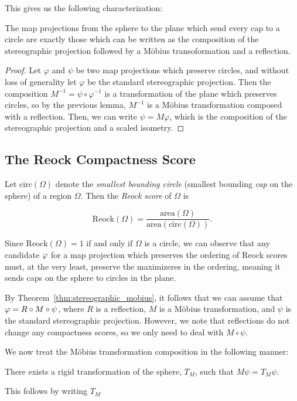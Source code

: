 This gives us the following characterization:
\begin{theorem}\label{thm:stereographic_mobius}
  The map projections from the sphere to the plane which send every
  cap to a circle are exactly those which can be written as the
  composition of the stereographic projection followed by a 
  M\"{o}bius transoformation and a reflection.
\end{theorem}
\begin{proof}
  Let $\varphi$ and $\psi$ be two map projections which preserve
  circles, and without loss of generality let $\varphi$ be the
  standard stereographic projection.  Then the composition
  $M^{-1}=\psi\circ\varphi^{-1}$ is a transformation of 
  the plane which preserves circles, so by the previous lemma, 
  $M^{-1}$ is a M\"{o}bius transformation composed with a reflection. 
  Then, we can write $\psi= M\varphi$, which is the
  composition of the stereographic projection and a scaled isometry.
\end{proof}
\subsection{The Reock Compactness Score}
Let $\mathrm{circ}(\Omega)$ denote the \textit{smallest bounding
circle} (smallest bounding \textit{cap} on the sphere) of a region
$\Omega$.  Then the \textit{Reock score} of $\Omega$ is 

$$\mathrm{Reock}(\Omega)=
\frac{\mathrm{area}(\Omega)}{\mathrm{area}(\mathrm{circ}(\Omega))}.$$

Since $\mathrm{Reock}(\Omega)=1$ if and only if $\Omega$ is a circle,
we can observe that any candidate $\varphi$ for a map projection 
which preserves the ordering of Reock scores must, at the 
very least, preserve the maximizeres in the ordering, meaning 
it sends caps on the sphere to circles in the plane.  

By Theorem~\ref{thm:stereographic_mobius}, it follows that 
we can assume that $\varphi=R\circ M \circ \psi$, 
where $R$ is a reflection, $M$ is a M\"{o}bius 
transformation, and $\psi$ is the standard 
stereographic projection. However, we note that reflections do not 
change any compactness scores, so we only need 
to deal with $M\circ \psi$.

We now treat the M\"{o}bius transformation composition 
in the following manner:
\begin{claim}
  There exists a rigid transformation of the 
  sphere, $T_M$, such that $M\psi = T_M\psi$.
\end{claim}
This follows by writing $T_M$

